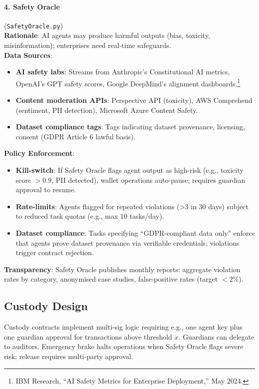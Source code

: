 \documentclass[11pt]{article}
\begin{document}
\paragraph{4. Safety Oracle} (\texttt{SafetyOracle.py})\\
\textbf{Rationale}: AI agents may produce harmful outputs (bias, toxicity, misinformation); enterprises need real-time safeguards.\\
\textbf{Data Sources}:
\begin{itemize}[noitemsep]
  \item \textbf{AI safety labs}: Streams from Anthropic's Constitutional AI metrics, OpenAI's GPT safety scores, Google DeepMind's alignment dashboards.\footnote{IBM Research, ``AI Safety Metrics for Enterprise Deployment,'' May 2024.}
  \item \textbf{Content moderation APIs}: Perspective API (toxicity), AWS Comprehend (sentiment, PII detection), Microsoft Azure Content Safety.
  \item \textbf{Dataset compliance tags}: Tags indicating dataset provenance, licensing, consent (GDPR Article 6 lawful basis).
\end{itemize}
\textbf{Policy Enforcement}:
\begin{itemize}[noitemsep]
  \item \textbf{Kill-switch}: If Safety Oracle flags agent output as high-risk (e.g., toxicity score $>0.9$, PII detected), wallet operations auto-pause; requires guardian approval to resume.
  \item \textbf{Rate-limits}: Agents flagged for repeated violations (>3 in 30 days) subject to reduced task quotas (e.g., max 10 tasks/day).
  \item \textbf{Dataset compliance}: Tasks specifying ``GDPR-compliant data only'' enforce that agents prove dataset provenance via verifiable credentials; violations trigger contract rejection.
\end{itemize}
\textbf{Transparency}: Safety Oracle publishes monthly reports: aggregate violation rates by category, anonymised case studies, false-positive rates (target $<2\%$).

\subsection{Custody Design}
Custody contracts implement multi-sig logic requiring e.g., one agent key plus one guardian approval for transactions above threshold $x$. Guardians can delegate to auditors. Emergency brake halts operations when Safety Oracle flags severe risk; release requires multi-party approval.
\end{document}
